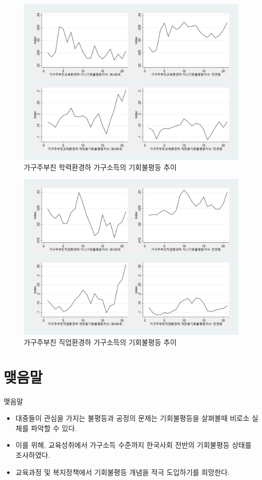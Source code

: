 \documentclass[handout, 10pt]{beamer}
\begin{document}
\begin{frame}
  \begin{figure}[htpb]
        \begin{center}
            \caption{가구주부친 학력환경하 가구소득의 기회불평등 추이}
            \includegraphics[scale=0.15]{incn1tm_edugrp.png}
        \end{center}
    \end{figure}
\end{frame}

\begin{frame}
  \begin{figure}[htpb]
        \begin{center}
            \caption{가구주부친 직업환경하 가구소득의 기회불평등 추이}
            \includegraphics[scale=0.15]{incn1tm_jobgrp.png}
        \end{center}
    \end{figure}
\end{frame}

\section{맺음말}
\begin{frame}{맺음말}
    \begin{itemize}
        \item 대중들이 관심을 가지는 불평등과 공정의 문제는 기회불평등을 살펴볼때 비로소 실체를 파악할 수 있다.
        \item 이를 위해, 교육성취에서 가구소득 수준까지 한국사회 전반의 기회불평등 상태를 조사하였다.
        \item 교육과정 및 복지정책에서 기회불평등 개념을 적극 도입하기를 희망한다.
    \end{itemize}
\end{frame}
\end{document}
